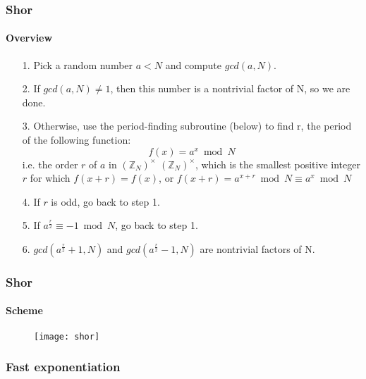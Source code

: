 \begin{frame}
	\frametitle{Shor}
		\framesubtitle{Overview}
		\begin{enumerate}
		\item[1.]{Pick a random number $a < N$ and compute $gcd(a, N)$.}\\
		\item[2.]{If $gcd(a, N) \neq 1$, then this number is a nontrivial factor of N, so we are done.}\\
		\item[3.]{Otherwise, use the period-finding subroutine (below) to find r, the period of the following function:}
		$$f(x)=a^{x}{\bmod {N}}$$
i.e. the order $r$ of $a$ in $(\mathbb {Z} _{N})^{\times }$ $(\mathbb {Z} _{N})^{\times }$, which is the smallest positive integer $r$ for which $f(x+r)=f(x)$, or $f(x+r)=a^{x+r}{\bmod {N}}\equiv a^{x}{\bmod {N}}$ 
		\item[4.]{If $r$ is odd, go back to step 1.}\\
		\item[5.]{If $a^{ \frac{r}{2}} \equiv -{1 \bmod{N}}$, go back to step 1.}\\
		\item[6.]{$gcd(a^{ \frac{r}{2}} + 1, N)$ and $gcd(a^{ \frac{r}{2}} - 1, N)$ are nontrivial factors of N.}\\
		\end{enumerate}
\end{frame}

\begin{frame}
	\frametitle{Shor}
		\framesubtitle{Scheme}
	\vspace{0.5cm}
		\begin{figure}
		\centering
			\texttt{[image: shor]}
			\label{fig:shor shor}
		\end{figure}

\end{frame}

\begin{frame}
	\frametitle{Fast exponentiation}
		\framesubtitle{}

		{\normalsize
		\\
		}
		

\end{frame}

